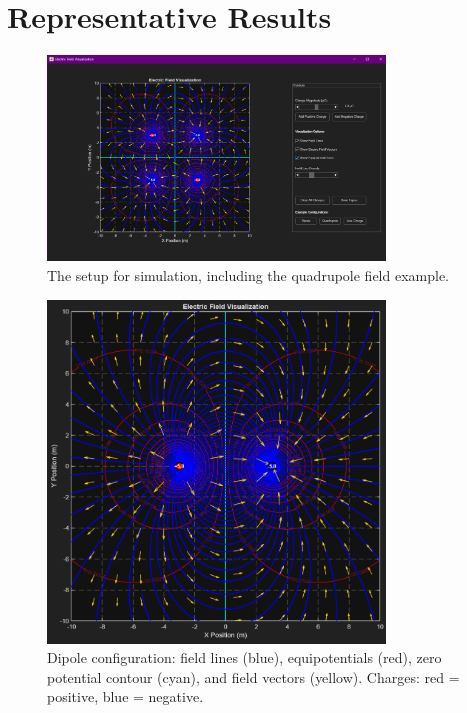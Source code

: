 \documentclass[12pt,a4paper]{article}
\begin{document}
\section{Representative Results}

\begin{figure}[H]
    \centering
    \includegraphics[width=0.8\textwidth]{../results/img/setup.png}
    \caption{The setup for simulation, including the quadrupole field example.}
\end{figure}

\begin{figure}[H]
    \centering
    \includegraphics[width=0.8\textwidth]{../results/img/dipole.png}
    \caption{Dipole configuration: field lines (\textcolor{myblue}{blue}), equipotentials (\textcolor{myred}{red}), zero potential contour (\textcolor{mycyan}{cyan}), and field vectors (\textcolor{myyellow}{yellow}). Charges: red = positive, blue = negative.}
\end{figure}
\end{document}
